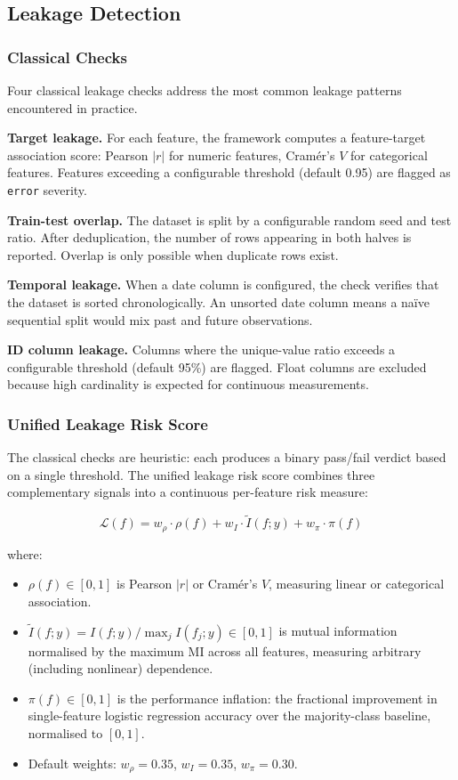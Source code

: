 \documentclass[12pt,a4paper]{report}
\begin{document}
\subsection{Leakage Detection}

\subsubsection{Classical Checks}

Four classical leakage checks address the most common leakage patterns encountered in practice.

\textbf{Target leakage.}  For each feature, the framework computes a feature-target
association score: Pearson $|r|$ for numeric features, Cram\'er's $V$ for categorical
features.  Features exceeding a configurable threshold (default 0.95) are flagged as
\texttt{error} severity.

\textbf{Train-test overlap.}  The dataset is split by a configurable random seed and
test ratio.  After deduplication, the number of rows appearing in both halves is reported.
Overlap is only possible when duplicate rows exist.

\textbf{Temporal leakage.}  When a date column is configured, the check verifies that the
dataset is sorted chronologically.  An unsorted date column means a naïve sequential split
would mix past and future observations.

\textbf{ID column leakage.}  Columns where the unique-value ratio exceeds a configurable
threshold (default 95\%) are flagged.  Float columns are excluded because high cardinality
is expected for continuous measurements.

\subsubsection{Unified Leakage Risk Score}
\label{sec:lrs}

The classical checks are heuristic: each produces a binary pass/fail verdict based on a
single threshold.  The unified leakage risk score combines three complementary signals into
a continuous per-feature risk measure:

\begin{equation}
\mathcal{L}(f) = w_\rho \cdot \rho(f) + w_I \cdot \tilde{I}(f;y) + w_\pi \cdot \pi(f)
\label{eq:lrs}
\end{equation}

where:
\begin{itemize}[leftmargin=1.5em]
\item $\rho(f) \in [0,1]$ is Pearson $|r|$ or Cram\'er's $V$, measuring linear or
  categorical association.
\item $\tilde{I}(f;y) = I(f;y) / \max_j I(f_j;y) \in [0,1]$ is mutual information
  normalised by the maximum MI across all features, measuring arbitrary (including
  nonlinear) dependence.
\item $\pi(f) \in [0,1]$ is the performance inflation: the fractional improvement
  in single-feature logistic regression accuracy over the majority-class baseline,
  normalised to $[0,1]$.
\item Default weights: $w_\rho{=}0.35$, $w_I{=}0.35$, $w_\pi{=}0.30$.
\end{itemize}
\end{document}
